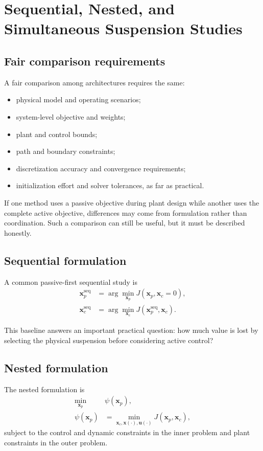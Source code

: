 \documentclass[11pt]{article}
\newcommand{\vect}[1]{\boldsymbol{#1}}
\newcommand{\xp}{\vect{x}_p}
\newcommand{\xc}{\vect{x}_c}
\newcommand{\xstate}{\vect{x}}
\newcommand{\uvec}{\vect{u}}
\begin{document}
\section{Sequential, Nested, and Simultaneous Suspension Studies}

\subsection{Fair comparison requirements}

A fair comparison among architectures requires the same:
\begin{itemize}[leftmargin=1.4em]
  \item physical model and operating scenarios;
  \item system-level objective and weights;
  \item plant and control bounds;
  \item path and boundary constraints;
  \item discretization accuracy and convergence requirements;
  \item initialization effort and solver tolerances, as far as practical.
\end{itemize}

If one method uses a passive objective during plant design while another uses the complete active objective, differences may come from formulation rather than coordination. Such a comparison can still be useful, but it must be described honestly.

\subsection{Sequential formulation}

A common passive-first sequential study is
\begin{align}
\xp^{\mathrm{seq}} &= \arg\min_{\xp} J(\xp,\xc=0), \\
\xc^{\mathrm{seq}} &= \arg\min_{\xc} J(\xp^{\mathrm{seq}},\xc).
\end{align}

This baseline answers an important practical question: how much value is lost by selecting the physical suspension before considering active control?

\subsection{Nested formulation}

The nested formulation is
\begin{align}
\min_{\xp} \quad & \psi(\xp), \\
\psi(\xp) &= \min_{\xc,\xstate(\cdot),\uvec(\cdot)} J(\xp,\xc),
\end{align}
subject to the control and dynamic constraints in the inner problem and plant constraints in the outer problem.
\end{document}
